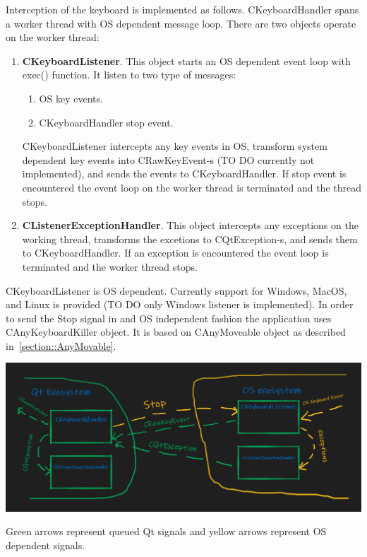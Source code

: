 \documentclass{article}
\begin{document}
Interception of the keyboard is implemented as follows. CKeyboardHandler spans a worker thread with OS dependent message loop. There are two objects operate on the worker thread:
\begin{enumerate}
\item \textbf{CKeyboardListener}. This object starts an OS dependent event loop with exec() function. It listen to two type of messages:
\begin{enumerate}
\item OS key events.
\item CKeyboardHandler stop event.
\end{enumerate}
CKeyboardListener intercepts any key events in OS, transform system dependent key events into CRawKeyEvent-s (TO DO currently not implemented), and sends the events to CKeyboardHandler. If stop event is encountered the event loop on the worker thread is terminated and the thread stops.

\item \textbf{CListenerExceptionHandler}. This object intercepts any exceptions on the working thread, transforms the excetions to CQtException-s, and sends them to CKeyboardHandler. If an exception is encountered the event loop is terminated and the worker thread stops.
\end{enumerate}

CKeyboardListener is OS dependent. Currently support for Windows, MacOS, and Linux is provided (TO DO only Windows listener is implemented). In order to send the Stop signal in and OS independent fashion the application uses CAnyKeyboardKiller object. It is based on CAnyMoveable object as described in~\ref{section::AnyMovable}.

\begin{center}
\includegraphics[scale = 0.5]{Figures/KeyboardInterception.png}

Green arrows represent queued Qt signals and yellow arrows represent OS dependent signals.
\end{center}
\end{document}
